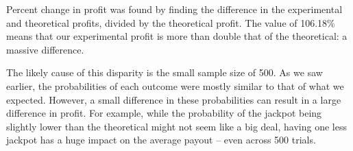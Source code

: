 \documentclass{article}
\begin{document}
{\vspace{2ex}

Percent change in profit was found by finding the difference in the experimental and theoretical profits, divided by the theoretical profit. The value of 106.18\% means that our experimental profit is more than double that of the theoretical: a massive difference.

\vspace{2ex}

The likely cause of this disparity is the small sample size of 500. As we saw earlier, the probabilities of each outcome were mostly similar to that of what we expected. However, a small difference in these probabilities can result in a large difference in profit. For example, while the probability of the jackpot being slightly lower than the theoretical might not seem like a big deal, having one less jackpot has a huge impact on the average payout -- even across 500 trials.
}
\end{document}
